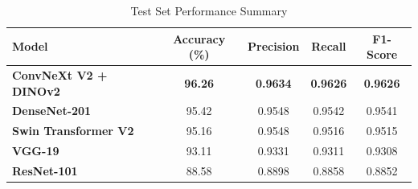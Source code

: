 \documentclass[11pt,a4paper]{article}
\begin{document}
\begin{table}[H]
\centering
\caption{Test Set Performance Summary}
\label{tab:test_summary}
\begin{tabular}{lcccc}
\toprule
\textbf{Model} & \textbf{Accuracy (\%)} & \textbf{Precision} & \textbf{Recall} & \textbf{F1-Score} \\
\midrule
\textbf{ConvNeXt V2 + DINOv2} & \textbf{96.26} & \textbf{0.9634} & \textbf{0.9626} & \textbf{0.9626} \\
\textbf{DenseNet-201}          & 95.42          & 0.9548          & 0.9542          & 0.9541          \\
\textbf{Swin Transformer V2}   & 95.16          & 0.9548          & 0.9516          & 0.9515          \\
\textbf{VGG-19}                & 93.11          & 0.9331          & 0.9311          & 0.9308          \\
\textbf{ResNet-101}            & 88.58          & 0.8898          & 0.8858          & 0.8852          \\
\bottomrule
\end{tabular}
\end{table}
\end{document}
